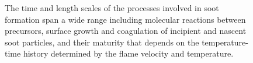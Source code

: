 \begin{figure}[H]
	\centering
	\caption{The time and length scales of the processes involved in soot formation span a wide range including molecular reactions between precursors, surface growth and coagulation of incipient and nascent soot particles, and their maturity that depends on the temperature-time history determined by the flame velocity and temperature.}
	\label{fig:sootscales}
\end{figure}



